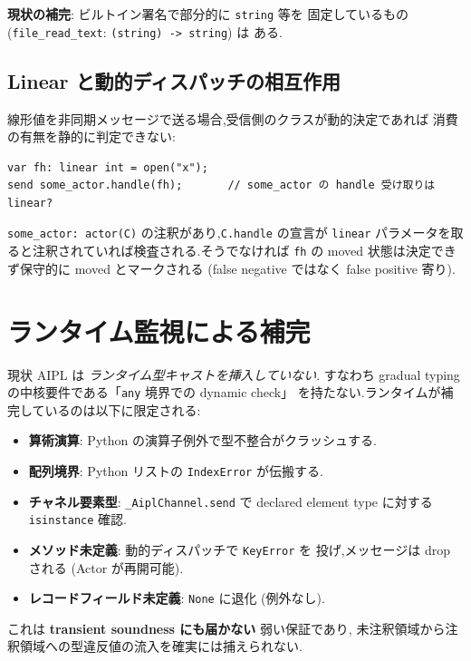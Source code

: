 \documentclass[11pt,a4paper]{article}
\newcommand{\code}[1]{\texttt{\small #1}}
\begin{document}
\textbf{現状の補完}: ビルトイン署名で部分的に \code{string} 等を
固定しているもの (\code{file\_read\_text}: \code{(string) -> string}) は
ある.

\subsection{Linear と動的ディスパッチの相互作用}

線形値を非同期メッセージで送る場合,受信側のクラスが動的決定であれば
消費の有無を静的に判定できない:

\begin{lstlisting}
var fh: linear int = open("x");
send some_actor.handle(fh);       // some_actor の handle 受け取りは linear?
\end{lstlisting}

\code{some\_actor: actor(C)} の注釈があり,\code{C.handle} の宣言が
\code{linear} パラメータを取ると注釈されていれば検査される.そうでなければ
\code{fh} の moved 状態は決定できず保守的に moved とマークされる
(false negative ではなく false positive 寄り).

\section{ランタイム監視による補完}
\label{sec:runtime}

現状 AIPL は \emph{ランタイム型キャストを挿入していない}.
すなわち gradual typing の中核要件である「\code{any} 境界での dynamic check」
を持たない.ランタイムが補完しているのは以下に限定される:

\begin{itemize}[leftmargin=1.5em]
\item \textbf{算術演算}: Python の演算子例外で型不整合がクラッシュする.
\item \textbf{配列境界}: Python リストの \code{IndexError} が伝搬する.
\item \textbf{チャネル要素型}: \code{\_AiplChannel.send} で declared
      element type に対する \code{isinstance} 確認.
\item \textbf{メソッド未定義}: 動的ディスパッチで \code{KeyError} を
      投げ,メッセージは drop される (Actor が再開可能).
\item \textbf{レコードフィールド未定義}: \code{None} に退化 (例外なし).
\end{itemize}

これは \textbf{transient soundness にも届かない} 弱い保証であり,
未注釈領域から注釈領域への型違反値の流入を確実には捕えられない.
\end{document}
